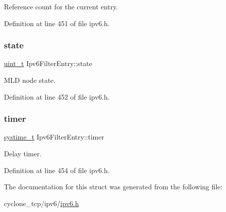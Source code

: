 Reference count for the current entry. 



Definition at line 451 of file ipv6.\+h.

\mbox{\label{structIpv6FilterEntry_a1b5076e55c13c43bdf6eb2b501a483df}} 
\subsubsection{\texorpdfstring{state}{state}}
{\footnotesize\ttfamily \hyperlink{compiler__port_8h_a12a1e9b3ce141648783a82445d02b58d}{uint\+\_\+t} Ipv6\+Filter\+Entry\+::state}



M\+LD node state. 



Definition at line 452 of file ipv6.\+h.

\mbox{\label{structIpv6FilterEntry_a31cc506fa97ca4281048443be7eb8d6a}} 
\subsubsection{\texorpdfstring{timer}{timer}}
{\footnotesize\ttfamily \hyperlink{compiler__port_8h_ae3e32a98d431a02106616da3071832dd}{systime\+\_\+t} Ipv6\+Filter\+Entry\+::timer}



Delay timer. 



Definition at line 454 of file ipv6.\+h.



The documentation for this struct was generated from the following file\+:\begin{DoxyCompactItemize}
\item 
cyclone\+\_\+tcp/ipv6/\hyperlink{ipv6_8h}{ipv6.\+h}\end{DoxyCompactItemize}
